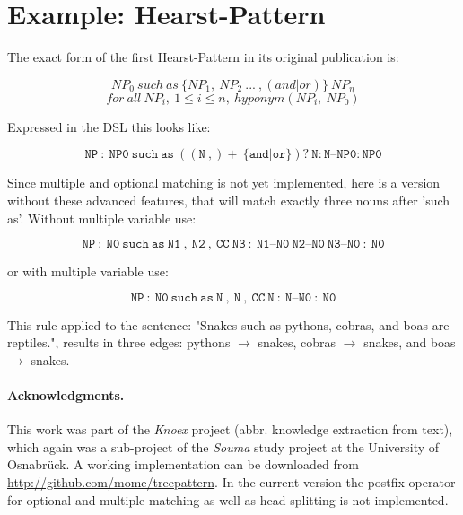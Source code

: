 \documentclass[english]{article}
\begin{document}

\section{Example: Hearst-Pattern}

The exact form of the first Hearst-Pattern in its original publication is:

\[
NP_0\ such\ as\ \{NP_1,\ NP_2\ ...\ ,(and|or)\}\ NP_n
\]
\[
for\ all\ NP_i,\ 1 \leq i \leq n,\ hyponym(NP_i,\ NP_0) 
\]


\noindent Expressed in the DSL this looks like:

\[
\mathtt{NP\ :\ NP0\ such\ as\ ((N\ ,){+}\ \{and|or\})?\ N : N\text{--}NP0 : NP0}
\]

\noindent Since multiple and optional matching is not yet implemented, here is a version without these advanced features, that will match exactly three nouns after 'such as'. Without multiple variable use:

\[
\mathtt{NP\ :\ N0\ such\ as\ N1\ ,\ N2\ ,\ CC\ N3\ :\ N1\text{--}N0\ N2\text{--}N0\ N3\text{--}N0\ :\ N0}
\]

\noindent or with multiple variable use:

\[
\mathtt{NP\ :\ N0\ such\ as\ N\ ,\ N\ ,\ CC\ N\ :\ N\text{--}N0\ :\ N0}
\]

\noindent This rule applied to the sentence: "Snakes such as pythons, cobras, and boas are reptiles.", results in three edges: pythons $\rightarrow$ snakes, cobras $\rightarrow$ snakes, and boas $\rightarrow$ snakes.


\paragraph{Acknowledgments.} This work was part of the \textit{Knoex} project (abbr. knowledge
extraction from text), which again was a sub-project of the \textit{Souma} study project at the University of Osnabrück. A working implementation can be downloaded from \url{http://github.com/mome/treepattern}. In the current version the postfix operator for optional and multiple matching as well as head-splitting is not implemented.



\end{document}
